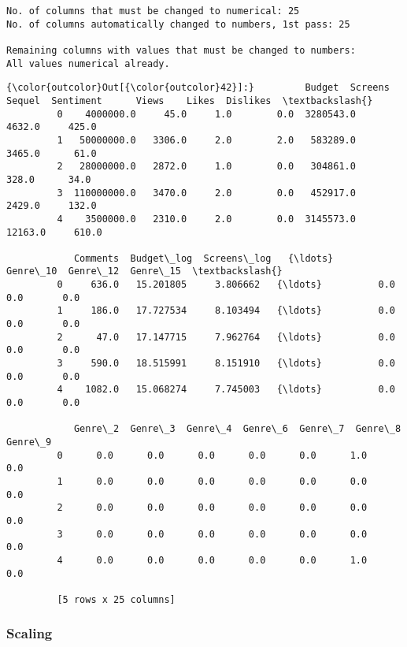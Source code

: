 \documentclass[11pt]{article}
\begin{document}
    \begin{Verbatim}[commandchars=\\\{\}]
No. of columns that must be changed to numerical: 25
No. of columns automatically changed to numbers, 1st pass: 25

Remaining columns with values that must be changed to numbers:
All values numerical already.

    \end{Verbatim}

\begin{Verbatim}[commandchars=\\\{\}]
{\color{outcolor}Out[{\color{outcolor}42}]:}         Budget  Screens  Sequel  Sentiment      Views    Likes  Dislikes  \textbackslash{}
         0    4000000.0     45.0     1.0        0.0  3280543.0   4632.0     425.0   
         1   50000000.0   3306.0     2.0        2.0   583289.0   3465.0      61.0   
         2   28000000.0   2872.0     1.0        0.0   304861.0    328.0      34.0   
         3  110000000.0   3470.0     2.0        0.0   452917.0   2429.0     132.0   
         4    3500000.0   2310.0     2.0        0.0  3145573.0  12163.0     610.0   
         
            Comments  Budget\_log  Screens\_log   {\ldots}     Genre\_10  Genre\_12  Genre\_15  \textbackslash{}
         0     636.0   15.201805     3.806662   {\ldots}          0.0       0.0       0.0   
         1     186.0   17.727534     8.103494   {\ldots}          0.0       0.0       0.0   
         2      47.0   17.147715     7.962764   {\ldots}          0.0       0.0       0.0   
         3     590.0   18.515991     8.151910   {\ldots}          0.0       0.0       0.0   
         4    1082.0   15.068274     7.745003   {\ldots}          0.0       0.0       0.0   
         
            Genre\_2  Genre\_3  Genre\_4  Genre\_6  Genre\_7  Genre\_8  Genre\_9  
         0      0.0      0.0      0.0      0.0      0.0      1.0      0.0  
         1      0.0      0.0      0.0      0.0      0.0      0.0      0.0  
         2      0.0      0.0      0.0      0.0      0.0      0.0      0.0  
         3      0.0      0.0      0.0      0.0      0.0      0.0      0.0  
         4      0.0      0.0      0.0      0.0      0.0      1.0      0.0  
         
         [5 rows x 25 columns]
\end{Verbatim}
            
    \subsubsection{Scaling}\label{scaling}
\end{document}
